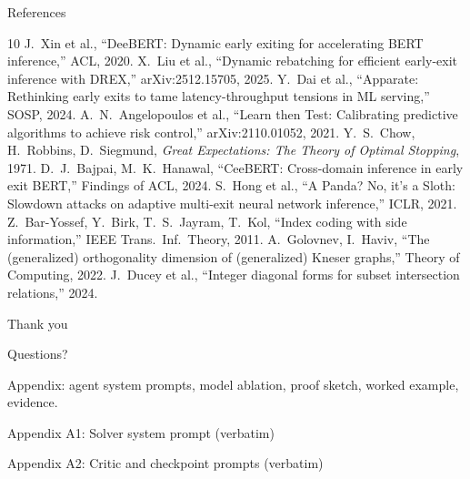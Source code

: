 \documentclass[11pt]{beamer}
\begin{document}
\begin{frame}{References}
  \scriptsize
  \begin{thebibliography}{10}
     J.~Xin et al., ``DeeBERT: Dynamic early exiting for accelerating BERT inference,'' ACL, 2020.
     X.~Liu et al., ``Dynamic rebatching for efficient early-exit inference with DREX,'' arXiv:2512.15705, 2025.
     Y.~Dai et al., ``Apparate: Rethinking early exits to tame latency-throughput tensions in ML serving,'' SOSP, 2024.
     A.~N.~Angelopoulos et al., ``Learn then Test: Calibrating predictive algorithms to achieve risk control,'' arXiv:2110.01052, 2021.
     Y.~S.~Chow, H.~Robbins, D.~Siegmund, \emph{Great Expectations: The Theory of Optimal Stopping}, 1971.
     D.~J.~Bajpai, M.~K.~Hanawal, ``CeeBERT: Cross-domain inference in early exit BERT,'' Findings of ACL, 2024.
     S.~Hong et al., ``A Panda? No, it's a Sloth: Slowdown attacks on adaptive multi-exit neural network inference,'' ICLR, 2021.
     Z.~Bar-Yossef, Y.~Birk, T.~S.~Jayram, T.~Kol, ``Index coding with side information,'' IEEE Trans.\ Inf.\ Theory, 2011.
     A.~Golovnev, I.~Haviv, ``The (generalized) orthogonality dimension of (generalized) Kneser graphs,'' Theory of Computing, 2022.
     J.~Ducey et al., ``Integer diagonal forms for subset intersection relations,'' 2024.
  \end{thebibliography}
\end{frame}

\begin{frame}
  \centering
  \vfill
  {\Huge\color{structure.fg} Thank you}\par\bigskip
  {\large Questions?}\par\vfill
  {\footnotesize Appendix: agent system prompts, model ablation, proof sketch, worked example, evidence.}
\end{frame}

\appendix

\begin{frame}[fragile]{Appendix A1: Solver system prompt (verbatim)}
  
\end{frame}

\begin{frame}[fragile]{Appendix A2: Critic and checkpoint prompts (verbatim)}
  
\end{frame}
\end{document}
